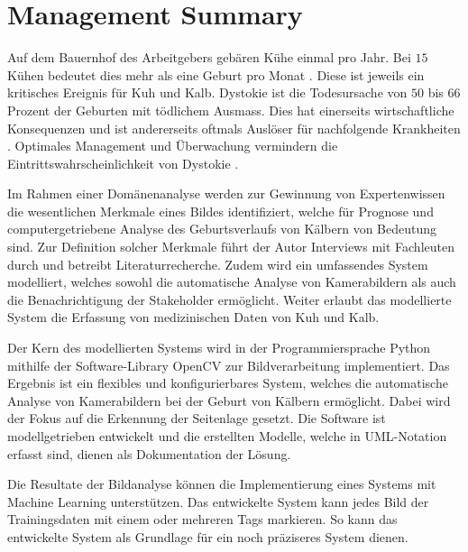 

\chapter{Management Summary}

Auf dem Bauernhof des Arbeitgebers gebären Kühe einmal pro Jahr. Bei $15$ Kühen bedeutet dies mehr als eine Geburt pro Monat \citep{Muller2019}. Diese ist jeweils ein kritisches Ereignis für Kuh und Kalb. \gls{Dystokie} ist die Todesursache von $50$ bis $66$ Prozent der Geburten mit tödlichem Ausmass. Dies hat einerseits wirtschaftliche Konsequenzen \citep[S. 1]{Saint-Dizier2015} und ist andererseits oftmals Auslöser für nachfolgende Krankheiten \citep[S. 1]{Lange2017}.  Optimales Management und Überwachung vermindern die Eintrittswahrscheinlichkeit von Dystokie \citep[S. 1]{Lange2017}. 

Im Rahmen einer Domänenanalyse werden zur Gewinnung von Expertenwissen die wesentlichen Merkmale eines Bildes  identifiziert, welche für Prognose und computergetriebene Analyse des Geburtsverlaufs von Kälbern von Bedeutung sind. Zur Definition solcher Merkmale führt der Autor Interviews mit Fachleuten durch und betreibt Literaturrecherche. Zudem wird ein umfassendes System modelliert, welches sowohl die automatische Analyse von Kamerabildern als auch die Benachrichtigung der Stakeholder ermöglicht. Weiter erlaubt das modellierte System die Erfassung von medizinischen Daten von Kuh und Kalb.

Der Kern des modellierten Systems wird in der Programmiersprache Python mithilfe der Software-Library OpenCV zur Bildverarbeitung implementiert. Das Ergebnis ist ein flexibles und konfigurierbares System, welches die automatische Analyse von Kamerabildern bei der Geburt von Kälbern ermöglicht. Dabei wird der Fokus auf die Erkennung der Seitenlage gesetzt. Die Software ist modellgetrieben entwickelt und die erstellten Modelle, welche in UML-Notation erfasst sind, dienen als Dokumentation der Lösung.

Die Resultate der Bildanalyse können die Implementierung eines Systems mit Machine Learning unterstützen. Das entwickelte System kann jedes Bild der Trainingsdaten mit einem oder mehreren \glqq{}Tags\grqq{} markieren. So kann das entwickelte System als Grundlage für ein noch präziseres System dienen.

